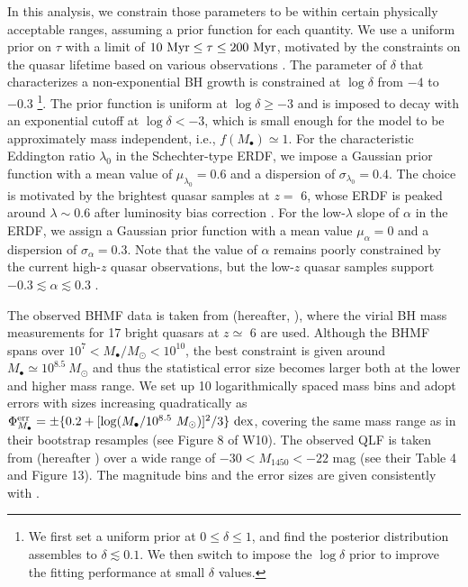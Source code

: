 \documentclass[twocolumn, twocolappendix]{aastex63}
\newcommand{\Msun}{M_\odot}
\newcommand{\Mbh}{M_\bullet}
\newcommand{\tlife}{\tau}
\newcommand{\Muv}{M_{1450}}
\begin{document}
\begin{CJK*}{UTF8}{gbsn}
In this analysis, we constrain those parameters to be within certain physically acceptable ranges, 
assuming a prior function for each quantity.
We use a uniform prior on $\tlife$ with a limit of $10~{\rm Myr} \leq \tlife \leq 200~{\rm Myr}$,
motivated by the constraints on the quasar lifetime based on various observations
\citep[e.g.,][]{2004cbhg.symp..169M}.
The parameter of $\delta$ that characterizes a non-exponential BH growth 
is constrained at $\log \delta$ from $-4$ to $-0.3$
\footnote[3]{ We first set a uniform prior at $0\leq \delta \leq 1$, 
and find the posterior distribution assembles to $\delta \lesssim 0.1$.
We then switch to impose the $\log \delta$ prior to improve the fitting performance at small $\delta$ values.}.
The prior function is uniform at $\log \delta \geq -3$ and is imposed to decay with an exponential cutoff at $\log \delta < -3$,
which is small enough for the model to be approximately mass independent, i.e., $f(M_\bullet)\simeq1$.
For the characteristic Eddington ratio $\lambda_0$ in the Schechter-type ERDF, 
we impose a Gaussian prior function with a mean value of $\mu_{\lambda_0}=0.6$ and a dispersion of $\sigma_{\lambda_0}=0.4$.
The choice is motivated by the brightest quasar samples at $z=$ 6, whose ERDF is peaked around $\lambda \sim 0.6$ 
after luminosity bias correction \citep[e.g.,][]{2010AJ....140..546W}.
For the low-$\lambda$ slope of $\alpha$ in the ERDF, we assign a Gaussian prior function with a mean value 
$\mu_{\alpha}=0$ and a dispersion of $\sigma_{\alpha}=0.3$.
Note that the value of $\alpha$ remains poorly constrained by the current high-$z$ quasar observations,
but the low-$z$ quasar samples support $-0.3 \lesssim \alpha \lesssim 0.3$ \citep[e.g., see Figure 21 in][]{2015MNRAS.447.2085S}.


The observed BHMF data is taken from \citet{2010AJ....140..546W} (hereafter, ), where 
the virial BH mass measurements for 17 bright quasars at $z\simeq $ 6 are used.
Although the BHMF spans over $10^7 < \Mbh/\Msun <10^{10}$, the best constraint is given around 
$\Mbh \simeq 10^{8.5}~\Msun$
and thus the statistical error size becomes larger both at the lower and higher mass range.
We set up 10 logarithmically spaced mass bins and adopt errors with sizes increasing quadratically as 
$\Phi_{\Mbh}^{\rm err} = \pm \{0.2 +   [\log (\Mbh/10^{8.5}~\Msun)]^2/3 \}~{\rm dex}$,
covering the same mass range as in their bootstrap resamples (see Figure 8 of W10). 
The observed QLF is taken from \citet{2018ApJ...869..150M} (hereafter ) 
over a wide range of $-30 < \Muv <-22$ mag (see their Table 4 and Figure 13). 
The magnitude bins and the error sizes are given consistently with .


\end{CJK*}
\end{document}
